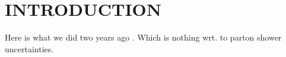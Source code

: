 \section{INTRODUCTION}
\label{sec:psunc:intro}

Here is what we did two years ago \cite{AlcarazMaestre:2012vp}. Which is 
nothing wrt. to parton shower uncertainties.

